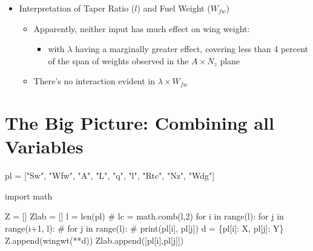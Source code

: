 \documentclass[
  letterpaper,
  DIV=11,
  numbers=noendperiod]{scrreprt}
\newenvironment{Shaded}{\begin{snugshade}}{\end{snugshade}}
\newcommand{\BuiltInTok}[1]{\textcolor[rgb]{0.00,0.23,0.31}{#1}}
\newcommand{\CommentTok}[1]{\textcolor[rgb]{0.37,0.37,0.37}{#1}}
\newcommand{\ControlFlowTok}[1]{\textcolor[rgb]{0.00,0.23,0.31}{#1}}
\newcommand{\DecValTok}[1]{\textcolor[rgb]{0.68,0.00,0.00}{#1}}
\newcommand{\ImportTok}[1]{\textcolor[rgb]{0.00,0.46,0.62}{#1}}
\newcommand{\KeywordTok}[1]{\textcolor[rgb]{0.00,0.23,0.31}{#1}}
\newcommand{\NormalTok}[1]{\textcolor[rgb]{0.00,0.23,0.31}{#1}}
\newcommand{\OperatorTok}[1]{\textcolor[rgb]{0.37,0.37,0.37}{#1}}
\newcommand{\StringTok}[1]{\textcolor[rgb]{0.13,0.47,0.30}{#1}}
\providecommand{\tightlist}{%
  \setlength{\itemsep}{0pt}\setlength{\parskip}{0pt}}\usepackage{longtable,booktabs,array}
\begin{document}
\begin{itemize}
\tightlist
\item
  Interpretation of Taper Ratio (\(l\)) and Fuel Weight (\(W_{fw}\))

  \begin{itemize}
  \tightlist
  \item
    Apparently, neither input has much effect on wing weight:

    \begin{itemize}
    \tightlist
    \item
      with \(\lambda\) having a marginally greater effect, covering less
      than 4 percent of the span of weights observed in the
      \(A \times N_z\) plane
    \end{itemize}
  \item
    There's no interaction evident in \(\lambda \times W_{fw}\)
  \end{itemize}
\end{itemize}

\section{The Big Picture: Combining all
Variables}\label{the-big-picture-combining-all-variables}

\begin{Shaded}
\begin{Highlighting}[]
\NormalTok{pl }\OperatorTok{=}\NormalTok{ [}\StringTok{"Sw"}\NormalTok{, }\StringTok{"Wfw"}\NormalTok{, }\StringTok{"A"}\NormalTok{, }\StringTok{"L"}\NormalTok{, }\StringTok{"q"}\NormalTok{, }\StringTok{"l"}\NormalTok{,  }\StringTok{"Rtc"}\NormalTok{, }\StringTok{"Nz"}\NormalTok{, }\StringTok{"Wdg"}\NormalTok{]}
\end{Highlighting}
\end{Shaded}

\begin{Shaded}
\begin{Highlighting}[]
\ImportTok{import}\NormalTok{ math}

\NormalTok{Z }\OperatorTok{=}\NormalTok{ []}
\NormalTok{Zlab }\OperatorTok{=}\NormalTok{ []}
\NormalTok{l }\OperatorTok{=} \BuiltInTok{len}\NormalTok{(pl)}
\CommentTok{\# lc = math.comb(l,2)}
\ControlFlowTok{for}\NormalTok{ i }\KeywordTok{in} \BuiltInTok{range}\NormalTok{(l):}
    \ControlFlowTok{for}\NormalTok{ j }\KeywordTok{in} \BuiltInTok{range}\NormalTok{(i}\OperatorTok{+}\DecValTok{1}\NormalTok{, l):}
    \CommentTok{\# for j in range(l):}
        \CommentTok{\# print(pl[i], pl[j])}
\NormalTok{        d }\OperatorTok{=}\NormalTok{ \{pl[i]: X, pl[j]: Y\}}
\NormalTok{        Z.append(wingwt(}\OperatorTok{**}\NormalTok{d))}
\NormalTok{        Zlab.append([pl[i],pl[j]])}
\end{Highlighting}
\end{Shaded}
\end{document}
